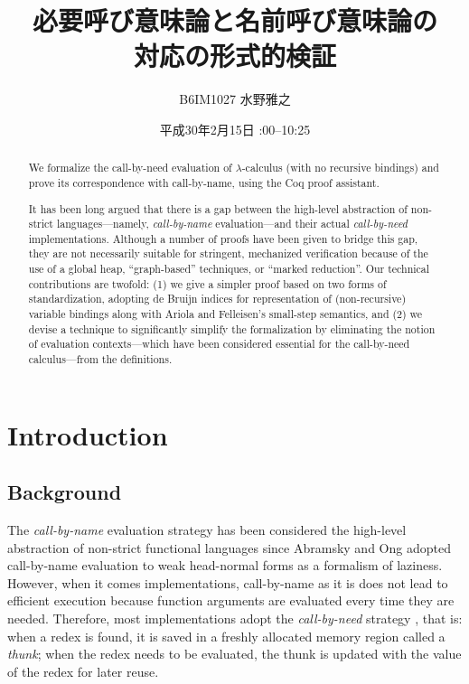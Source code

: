 \documentclass[english]{sumiilab-paper}
\title{必要呼び意味論と名前呼び意味論の\\対応の形式的検証}
\author{B6IM1027 水野雅之}
\institute{東北大学 大学院 情報科学研究科\\情報基礎科学専攻}%
\date{平成30年2月15日 \quad 10:00--10:25}
\begin{document}
\maketitle
%
\begin{abstract}
	We formalize the call-by-need evaluation of $\lambda$-calculus (with no recursive bindings) and prove
its correspondence with call-by-name, using the Coq proof assistant.

\; It has been long argued that there is a gap between the high-level
abstraction of non-strict languages---namely, \emph{call-by-name} evaluation---and
their actual \emph{call-by-need} implementations.
Although a number of proofs have been given to bridge this gap,
they are not necessarily suitable for stringent, mechanized verification
because of the use of a global heap, ``graph-based'' techniques,
or ``marked reduction''.
Our technical contributions are twofold:
(1) we give a simpler proof based on two forms of standardization,
	adopting de Bruijn indices for representation of (non-recursive) variable bindings
along with Ariola and Felleisen's small-step semantics, and
(2) we devise a technique to significantly simplify the formalization
by eliminating the notion of evaluation contexts---which have been considered
essential for the call-by-need calculus---from the definitions.
\end{abstract}
%
\tableofcontents
%
\chapter{Introduction}
\section{Background}
The \emph{call-by-name} evaluation strategy has been considered the high-level abstraction of non-strict functional languages
since Abramsky \cite{Abramsky90} and Ong \cite{Ong88} adopted call-by-name evaluation to weak head-normal forms as a formalism of laziness.
However, when it comes implementations, call-by-name as it is does not lead to efficient execution because function arguments are evaluated every time they are needed.
Therefore, most implementations adopt the \emph{call-by-need} strategy \cite{Wadsworth71}, that is: when a redex is found, it is saved in a freshly allocated memory region called a \emph{thunk}; when the redex needs to be evaluated, the thunk is updated with the value of the redex for later reuse.
\end{document}
